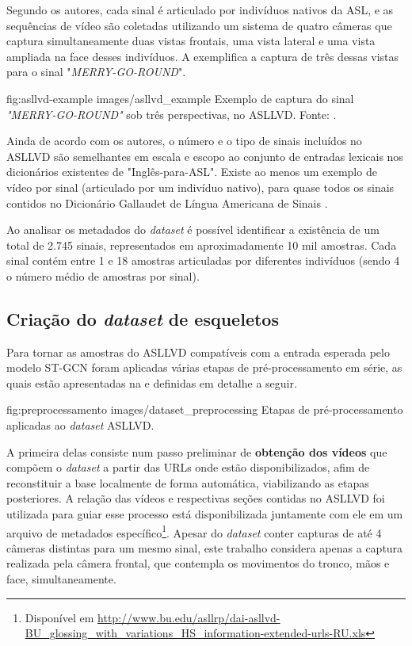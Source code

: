 Segundo os autores, cada sinal é articulado por indivíduos nativos da ASL, e as sequências de vídeo são coletadas utilizando um sistema de quatro câmeras que captura simultaneamente duas vistas frontais, uma vista lateral e uma vista ampliada na face desses indivíduos. A  exemplifica a captura de três dessas vistas para o sinal "\textit{MERRY-GO-ROUND}".

\image
    {fig:asllvd-example}
    {images/asllvd_example}
    {Exemplo de captura do sinal \textit{"MERRY-GO-ROUND"} sob três perspectivas, no ASLLVD. Fonte:  \cite[p. 2]{athitsos-asllvd-2008}.}

Ainda de acordo com os autores, o número e o tipo de sinais incluídos no ASLLVD são semelhantes em escala e escopo ao conjunto de entradas lexicais nos dicionários existentes de "Inglês-para-ASL". Existe ao menos um exemplo de vídeo por sinal (articulado por um indivíduo nativo), para quase todos os sinais contidos no Dicionário Gallaudet de Língua Americana de Sinais \cite{athitsos-asllvd-2008, gallaudet-2005}. 

Ao analisar os metadados do \textit{dataset} é possível identificar a existência de um total de 2.745 sinais, representados em aproximadamente 10 mil amostras. Cada sinal contém entre 1 e 18 amostras articuladas por diferentes indivíduos (sendo 4 o número médio de amostras por sinal).


\subsection{Criação do \textit{dataset} de esqueletos} %
\label{sec:preproc-dataset}

Para tornar as amostras do ASLLVD compatíveis com a entrada esperada pelo modelo ST-GCN foram aplicadas várias etapas de pré-processamento em série, as quais estão apresentadas na  e definidas em detalhe a seguir.

\image
    {fig:preprocessamento}
    {images/dataset_preprocessing}
    {Etapas de pré-processamento aplicadas ao \textit{dataset} ASLLVD.}

A primeira delas consiste num passo preliminar de \textbf{obtenção dos vídeos} que compõem o \textit{dataset} a partir das URLs onde estão disponibilizados, afim de reconstituir a base localmente de forma automática, viabilizando as etapas posteriores. A relação das vídeos e respectivas seções contidas no ASLLVD foi utilizada para guiar esse processo está disponibilizada juntamente com ele em um arquivo de metadados específico\footnote{
    Disponível em \url{http://www.bu.edu/asllrp/dai-asllvd-BU_glossing_with_variations_HS_information-extended-urls-RU.xls}
}. Apesar do \textit{dataset} conter capturas de até 4 câmeras distintas para um mesmo sinal, este trabalho considera apenas a captura realizada pela câmera frontal, que contempla os movimentos do tronco, mãos e face, simultaneamente.

